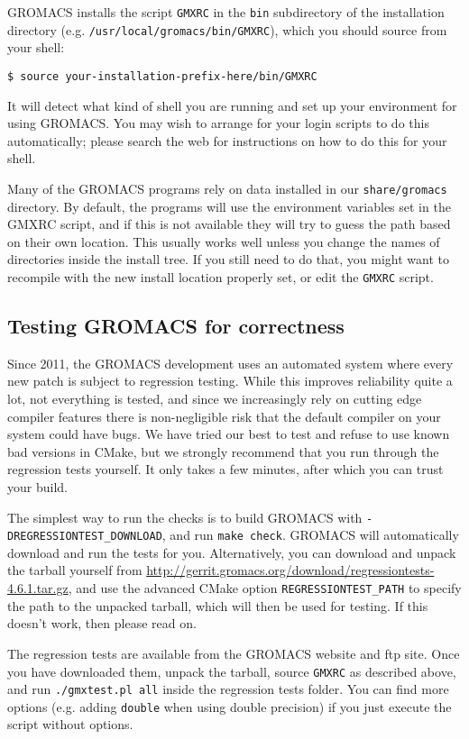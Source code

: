 \documentclass{article}[12pt,a4paper,twoside]
\newcommand{\gromacs}{GROMACS}
\newcommand{\cmake}{CMake}
\begin{document}
\gromacs{} installs the script \verb+GMXRC+ in the \verb+bin+
subdirectory of the installation directory
(e.g. \verb+/usr/local/gromacs/bin/GMXRC+), which you should source
from your shell:
\begin{verbatim}
$ source your-installation-prefix-here/bin/GMXRC
\end{verbatim}

It will detect what kind of shell you are running and set up your
environment for using \gromacs{}. You may wish to arrange for your
login scripts to do this automatically; please search the web for
instructions on how to do this for your shell. 

Many of the \gromacs{} programs rely on data installed in our
\verb+share/gromacs+ directory. By default, the programs will use
the environment variables set in the GMXRC script, and if this is not
available they will try to guess the path based on their own location.
This usually works well unless you change the names of directories
inside the install tree. If you still need to do that, you might want to recompile
with the new install location properly set, or edit the \verb+GMXRC+ script.

\subsection{Testing \gromacs{} for correctness}
Since 2011, the \gromacs{} development uses an automated system where
every new patch is subject to regression testing. While this improves
reliability quite a lot, not everything is tested, and since we
increasingly rely on cutting edge compiler features there is
non-negligible risk that the default compiler on your system could
have bugs. We have tried our best to test and refuse to use known bad
versions in \cmake{}, but we strongly recommend that you run through
the regression tests yourself. It only takes a few minutes, after
which you can trust your build.

The simplest way to run the checks is to build \gromacs{} with
\verb+-DREGRESSIONTEST_DOWNLOAD+, and run \verb+make check+.
\gromacs{} will automatically download and run the tests for you.
Alternatively, you can download and unpack the tarball yourself from
\url{http://gerrit.gromacs.org/download/regressiontests-4.6.1.tar.gz},
and use the advanced \cmake{} option \verb+REGRESSIONTEST_PATH+ to
specify the path to the unpacked tarball, which will then be used for
testing. If this doesn't work, then please read on.

The regression tests are available from the \gromacs{} website and ftp
site.  Once you have downloaded them, unpack the tarball, source
\verb+GMXRC+ as described above, and run \verb+./gmxtest.pl all+
inside the regression tests folder. You can find more options
(e.g. adding \verb+double+ when using double precision) if you just
execute the script without options.
\end{document}
